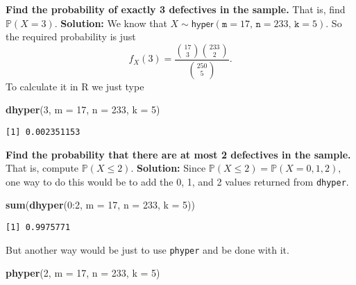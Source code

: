 \documentclass[]{book}
\newenvironment{Shaded}{\begin{snugshade}}{\end{snugshade}}
\newcommand{\KeywordTok}[1]{\textcolor[rgb]{0.13,0.29,0.53}{\textbf{{#1}}}}
\newcommand{\DataTypeTok}[1]{\textcolor[rgb]{0.13,0.29,0.53}{{#1}}}
\newcommand{\DecValTok}[1]{\textcolor[rgb]{0.00,0.00,0.81}{{#1}}}
\newcommand{\NormalTok}[1]{{#1}}
\numberwithin{equation}{chapter}
\numberwithin{figure}{chapter}
\theoremstyle{plain}
\theoremstyle{definition}
\theoremstyle{remark}
\theoremstyle{definition}
\theoremstyle{definition}
\theoremstyle{remark}
\begin{document}
\textbf{Find the probability of exactly 3 defectives in the sample.}
That is, find \(\mathbb{P}(X=3)\). \textbf{Solution:} We know that
\(X\sim\mathsf{hyper}(\mathtt{m}=17,\,\mathtt{n}=233,\,\mathtt{k}=5)\).
So the required probability is just \[ f_{X}(3)=\frac{{17 \choose 3}{233
\choose 2}}{{250 \choose 5}}.  \] To calculate it in R we just type

\begin{Shaded}
\begin{Highlighting}[]
\KeywordTok{dhyper}\NormalTok{(}\DecValTok{3}\NormalTok{, }\DataTypeTok{m =} \DecValTok{17}\NormalTok{, }\DataTypeTok{n =} \DecValTok{233}\NormalTok{, }\DataTypeTok{k =} \DecValTok{5}\NormalTok{)}
\end{Highlighting}
\end{Shaded}

\begin{verbatim}
[1] 0.002351153
\end{verbatim}

\textbf{Find the probability that there are at most 2 defectives in the
sample.} That is, compute \(\mathbb{P}(X\leq2)\). \textbf{Solution:}
Since \(\mathbb{P}(X\leq2)=\mathbb{P}(X=0,1,2)\), one way to do this
would be to add the 0, 1, and 2 values returned from \texttt{dhyper}.

\begin{Shaded}
\begin{Highlighting}[]
\KeywordTok{sum}\NormalTok{(}\KeywordTok{dhyper}\NormalTok{(}\DecValTok{0}\NormalTok{:}\DecValTok{2}\NormalTok{, }\DataTypeTok{m =} \DecValTok{17}\NormalTok{, }\DataTypeTok{n =} \DecValTok{233}\NormalTok{, }\DataTypeTok{k =} \DecValTok{5}\NormalTok{))}
\end{Highlighting}
\end{Shaded}

\begin{verbatim}
[1] 0.9975771
\end{verbatim}

But another way would be just to use \texttt{phyper} and be done with
it.

\begin{Shaded}
\begin{Highlighting}[]
\KeywordTok{phyper}\NormalTok{(}\DecValTok{2}\NormalTok{, }\DataTypeTok{m =} \DecValTok{17}\NormalTok{, }\DataTypeTok{n =} \DecValTok{233}\NormalTok{, }\DataTypeTok{k =} \DecValTok{5}\NormalTok{)}
\end{Highlighting}
\end{Shaded}
\end{document}
